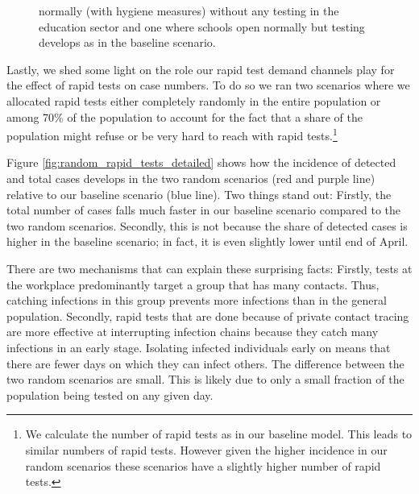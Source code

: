 \begin{figure}[ht]
{   normally (with hygiene measures) without any testing in the education sector and one
   where schools open normally but testing develops as in the baseline scenario.   %
   }
\end{figure}

\FloatBarrier

Lastly, we shed some light on the role our rapid test demand channels play
for the effect of rapid tests on case numbers. To do so we ran two scenarios where we
allocated rapid tests either completely randomly in the entire population or among 70\%
of the population to account for the fact that a share of the population might refuse or
be very hard to reach with rapid tests.\footnote{We calculate the number of rapid tests
as in our baseline model. This leads to similar numbers of rapid tests. However given the
higher incidence in our random scenarios these scenarios have a slightly higher number of
rapid tests.}

Figure \ref{fig:random_rapid_tests_detailed} shows how the incidence of detected and
total cases develops in the two random scenarios (red and purple line) relative to our
baseline scenario (blue line). Two things stand out: Firstly, the total number of cases
falls much faster in our baseline scenario compared to the two random scenarios.
Secondly, this is not because the share of detected cases is higher in the baseline
scenario; in fact, it is even slightly lower until end of April.

There are two mechanisms that can explain these surprising facts: Firstly, tests at the
workplace predominantly target a group that has many contacts. Thus, catching infections
in this group prevents more infections than in the general population. Secondly, rapid
tests that are done because of private contact tracing are more effective at interrupting
infection chains because they catch many infections in an early stage. Isolating infected
individuals early on means that there are fewer days on which they can infect others.
%
The difference between the two random scenarios are small. This is likely due to only a
small fraction of the population being tested on any given day.



